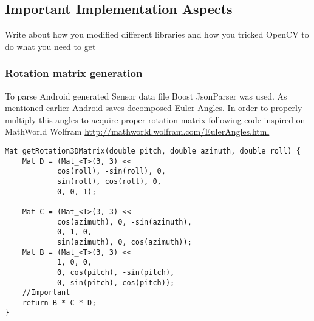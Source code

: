 \subsection{Important Implementation Aspects}
Write about how you modified different libraries and how you tricked OpenCV to do what you need to get
\subsubsection{Rotation matrix generation}
To parse Android generated Sensor data file Boost JsonParser was used. As mentioned earlier Android saves decomposed Euler Angles. In order to properly multiply this angles to acquire proper rotation matrix following code inspired on MathWorld Wolfram \url{http://mathworld.wolfram.com/EulerAngles.html}
\begin{lstlisting}
Mat getRotation3DMatrix(double pitch, double azimuth, double roll) {
    Mat D = (Mat_<T>(3, 3) <<
            cos(roll), -sin(roll), 0,
            sin(roll), cos(roll), 0,
            0, 0, 1);

    Mat C = (Mat_<T>(3, 3) <<
            cos(azimuth), 0, -sin(azimuth),
            0, 1, 0,
            sin(azimuth), 0, cos(azimuth));
    Mat B = (Mat_<T>(3, 3) <<
            1, 0, 0,
            0, cos(pitch), -sin(pitch),
            0, sin(pitch), cos(pitch));
    //Important
    return B * C * D;
}
\end{lstlisting}
